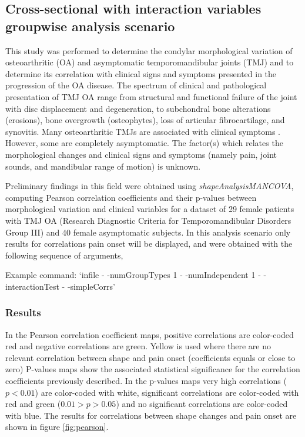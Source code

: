 \documentclass{InsightArticle}
\newcommand{\ProgramName}{\textit{shapeAnalysisMANCOVA}}
\begin{document}
\subsection{Cross-sectional with interaction variables groupwise analysis scenario}
\label{sec:results3}

This study was performed to determine the condylar morphological variation of osteoarthritic (OA) and asymptomatic temporomandibular joints (TMJ) and to determine its correlation with clinical signs and symptoms presented in the progression of the OA disease. The spectrum of clinical and pathological presentation of TMJ OA range from structural and functional failure of the joint with disc displacement and degeneration, to subchondral bone alterations (erosions), bone overgrowth (osteophytes), loss of articular fibrocartilage, and synovitis. Many osteoarthritic TMJs are associated with clinical symptoms \cite{Hatcher91} \cite{Helenius05}. However, some are completely asymptomatic. The factor(s) which relates the morphological changes and clinical signs and symptoms (namely pain, joint sounds, and mandibular range of motion) is unknown.  

Preliminary findings in this field were obtained using \ProgramName, computing Pearson correlation coefficients and their p-values between morphological variation and clinical variables for a dataset of 29 female patients with TMJ OA (Research Diagnostic Criteria for Temporomandibular Disorders Group III) and 40 female asymptomatic subjects. In this analysis scenario only results for correlations pain onset will be displayed, and were obtained with the following sequence of arguments,

Example command: `\program infile - -numGroupTypes 1 - -numIndependent 1 - -interactionTest - -simpleCorrs'

\subsubsection{Results}
\label{sec:lilresults3}

In the Pearson correlation coefficient maps, positive correlations are color-coded red and negative correlations are green. Yellow is used where there are no relevant correlation between shape and pain onset (coefficients equals or close to zero) P-values maps show the associated statistical significance for the correlation coefficients previously described. In the p-values maps very high correlations ($p < 0.01$) are color-coded with white, significant correlations are color-coded with red and green ($0.01 > p > 0.05$) and no significant correlations are color-coded with blue. The results for correlations between shape changes and pain onset are shown in figure \ref{fig:pearson}.
\end{document}
